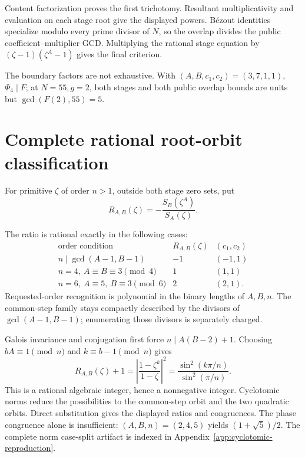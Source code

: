\documentclass[11pt]{article}
\begin{document}
\begin{claimproof}
Content factorization proves the first trichotomy.  Resultant
multiplicativity and evaluation on each stage root give the displayed
powers.  Bézout identities specialize modulo every prime divisor of \(N\),
so the overlap divides the public coefficient--multiplier GCD.  Multiplying
the rational stage equation by
\((\zeta-1)(\zeta^A-1)\) gives the final criterion.
\end{claimproof}

The boundary factors are not exhaustive.  With
\((A,B,c_1,c_2)=(3,7,1,1)\), \(\Phi_4\mid F\); at \(N=55,g=2\), both
stages and both public overlap bounds are units but
\(\gcd(F(2),55)=5\).

\section{Complete rational root-orbit classification}

For primitive \(\zeta\) of order \(n>1\), outside both stage zero sets, put
\[
 R_{A,B}(\zeta)=-\frac{S_B(\zeta^A)}{S_A(\zeta)}.
\]

{}
The ratio is rational exactly in the
following cases:
\[
\begin{array}{c|c|c}
\text{order condition}&R_{A,B}(\zeta)&(c_1,c_2)\\ \hline
n\mid\gcd(A-1,B-1)&-1&(-1,1)\\
n=4,\ A\equiv B\equiv3\pmod4&1&(1,1)\\
n=6,\ A\equiv5,\ B\equiv3\pmod6&2&(2,1).
\end{array}
\]
Requested-order recognition is polynomial in the binary lengths of
\(A,B,n\).  The common-step family stays compactly described by the divisors
of \(\gcd(A-1,B-1)\); enumerating those divisors is separately charged.

\begin{claimproof}
Galois invariance and conjugation first force
\(n\mid A(B-2)+1\).  Choosing \(bA\equiv1\pmod n\) and
\(k\equiv b-1\pmod n\) gives
\[
 R_{A,B}(\zeta)+1
 =\left|\frac{1-\zeta^k}{1-\zeta}\right|^2
 =\frac{\sin^2(k\pi/n)}{\sin^2(\pi/n)}.
\]
This is a rational algebraic integer, hence a nonnegative integer.
Cyclotomic norms reduce the possibilities to the common-step orbit and the
two quadratic orbits.  Direct substitution gives the displayed ratios and
congruences.  The phase congruence alone is insufficient:
\((A,B,n)=(2,4,5)\) yields \((1+\sqrt5)/2\).
The complete norm case-split artifact is indexed in
Appendix~\ref{app:cyclotomic-reproduction}.
\end{claimproof}
\end{document}
